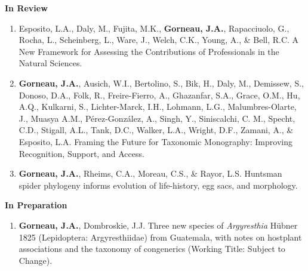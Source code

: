 
\color{darktext}\small\textbf{In Review}
\begin{enumerate}
\bodyfontlight\scriptsize\item Esposito, L.A., Daly, M., Fujita, M.K., \textbf{Gorneau, J.A.}, Rapacciuolo, G., Rocha, L., Scheinberg, L., Ware, J., Welch, C.K., Young, A., \& Bell, R.C. A New Framework for Assessing the Contributions of Professionals in the Natural Sciences.
\bodyfontlight\scriptsize\item\textbf{Gorneau, J.A.}, Ausich, W.I., Bertolino, S., Bik, H., Daly, M., Demissew, S., Donoso, D.A., Folk, R., Freire-Fierro, A., Ghazanfar, S.A., Grace, O.M., Hu, A.Q., Kulkarni, S., Lichter-Marck, I.H., Lohmann, L.G., Malumbres-Olarte, J., Muasya A.M., Pérez-González, A., Singh, Y., Siniscalchi, C. M., Specht, C.D., Stigall, A.L., Tank, D.C., Walker, L.A., Wright, D.F., Zamani, A., \& Esposito, L.A. Framing the Future for Taxonomic Monography: Improving Recognition, Support, and Access.
\bodyfontlight\scriptsize\item\textbf{Gorneau, J.A.}, Rheims, C.A., Moreau, C.S., \& Rayor, L.S. Huntsman spider phylogeny informs evolution of life-history, egg sacs, and morphology.
\end{enumerate}
\small\textbf{In Preparation}
\begin{enumerate}
\bodyfontlight\scriptsize\item\textbf{Gorneau, J.A.}, Dombroskie, J.J. Three new species of \textit{Argyresthia} Hübner 1825 (Lepidoptera: Argyresthiidae) from Guatemala, with notes on hostplant associations and the taxonomy of congenerics (Working Title: Subject to Change).
\end{enumerate}
